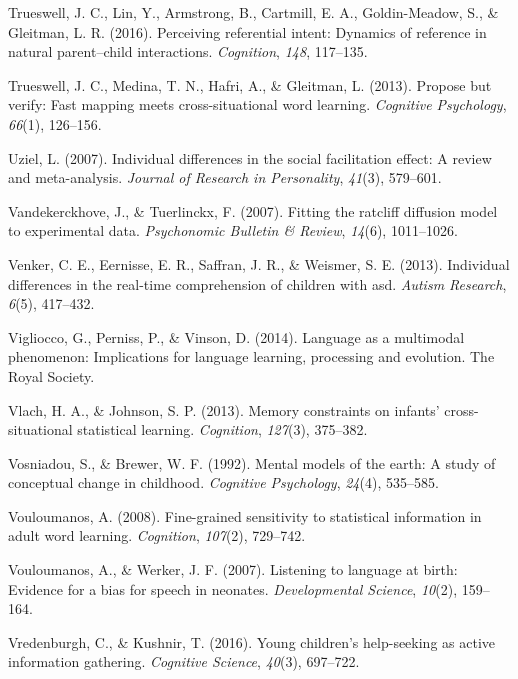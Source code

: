 \documentclass[oneside]{report}
\begin{document}
\hypertarget{ref-trueswell2016perceiving}{}
Trueswell, J. C., Lin, Y., Armstrong, B., Cartmill, E. A.,
Goldin-Meadow, S., \& Gleitman, L. R. (2016). Perceiving referential
intent: Dynamics of reference in natural parent--child interactions.
\emph{Cognition}, \emph{148}, 117--135.

\hypertarget{ref-trueswell2013propose}{}
Trueswell, J. C., Medina, T. N., Hafri, A., \& Gleitman, L. (2013).
Propose but verify: Fast mapping meets cross-situational word learning.
\emph{Cognitive Psychology}, \emph{66}(1), 126--156.

\hypertarget{ref-uziel2007individual}{}
Uziel, L. (2007). Individual differences in the social facilitation
effect: A review and meta-analysis. \emph{Journal of Research in
Personality}, \emph{41}(3), 579--601.

\hypertarget{ref-vandekerckhove2007fitting}{}
Vandekerckhove, J., \& Tuerlinckx, F. (2007). Fitting the ratcliff
diffusion model to experimental data. \emph{Psychonomic Bulletin \&
Review}, \emph{14}(6), 1011--1026.

\hypertarget{ref-venker2013individual}{}
Venker, C. E., Eernisse, E. R., Saffran, J. R., \& Weismer, S. E.
(2013). Individual differences in the real-time comprehension of
children with asd. \emph{Autism Research}, \emph{6}(5), 417--432.

\hypertarget{ref-vigliocco2014language}{}
Vigliocco, G., Perniss, P., \& Vinson, D. (2014). Language as a
multimodal phenomenon: Implications for language learning, processing
and evolution. The Royal Society.

\hypertarget{ref-vlach2013memory}{}
Vlach, H. A., \& Johnson, S. P. (2013). Memory constraints on infants'
cross-situational statistical learning. \emph{Cognition}, \emph{127}(3),
375--382.

\hypertarget{ref-vosniadou1992mental}{}
Vosniadou, S., \& Brewer, W. F. (1992). Mental models of the earth: A
study of conceptual change in childhood. \emph{Cognitive Psychology},
\emph{24}(4), 535--585.

\hypertarget{ref-vouloumanos2008fine}{}
Vouloumanos, A. (2008). Fine-grained sensitivity to statistical
information in adult word learning. \emph{Cognition}, \emph{107}(2),
729--742.

\hypertarget{ref-vouloumanos2007listening}{}
Vouloumanos, A., \& Werker, J. F. (2007). Listening to language at
birth: Evidence for a bias for speech in neonates. \emph{Developmental
Science}, \emph{10}(2), 159--164.

\hypertarget{ref-vredenburgh2016young}{}
Vredenburgh, C., \& Kushnir, T. (2016). Young children's help-seeking as
active information gathering. \emph{Cognitive Science}, \emph{40}(3),
697--722.
\end{document}
